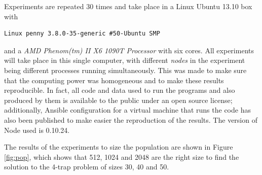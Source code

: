 \documentclass{sig-alternate}
\begin{document}
Experiments are repeated 30 times
and take place in a Linux Ubuntu 13.10 box with
\begin{lstlisting}
Linux penny 3.8.0-35-generic #50-Ubuntu SMP 
\end{lstlisting}
and a {\em AMD Phenom(tm) II X6 1090T Processor} with six cores. All
experiments will take place in this single computer, with different
{\em nodes} in the experiment being different processes running
simultaneously. This was made to make sure that the computing power was
homogeneous and to make these results reproducible. In fact, all code
and data used to run the programs and also produced by them is
available to the public under an open source license; additionally,
Ansible configuration for a virtual machine that runs the code has
also been published to make easier the reproduction of the
results. The version of Node used is 0.10.24.

The results of the experiments to size the population are shown in
Figure \ref{fig:pop}, which shows that 512, 1024 and 2048 are the
right size to find the solution to the 4-trap problem of sizes 30, 40
and 50. 
\end{document}
